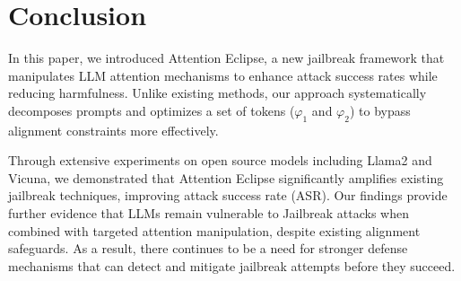 \section{Conclusion}

In this paper, we introduced Attention Eclipse, a new jailbreak framework that manipulates LLM attention mechanisms to enhance attack success rates while reducing harmfulness. Unlike existing methods, our approach systematically decomposes prompts and optimizes a set of tokens ($\varphi_1$ and $\varphi_2$) to bypass alignment constraints more effectively.  

Through extensive experiments on open source models including Llama2 and Vicuna, we demonstrated that Attention Eclipse significantly amplifies existing jailbreak techniques, improving attack success rate (ASR). %
Our findings provide further evidence that LLMs remain vulnerable to Jailbreak attacks when combined with targeted attention manipulation, despite existing alignment safeguards. As a result, there continues to be a need for stronger defense mechanisms that can detect and mitigate jailbreak attempts before they succeed.  

